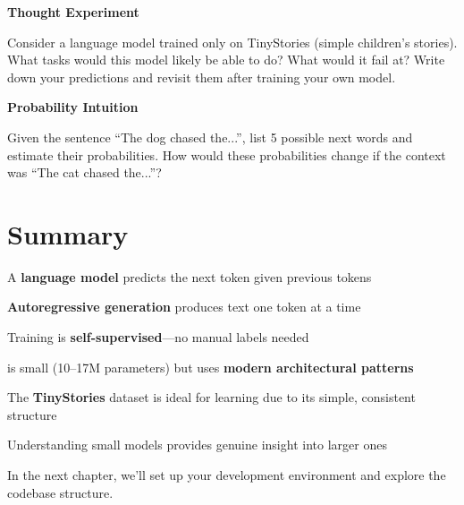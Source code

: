 \begin{exercise}
\textbf{Thought Experiment}

Consider a language model trained only on TinyStories (simple children's stories). What tasks would this model likely be able to do? What would it fail at? Write down your predictions and revisit them after training your own model.
\end{exercise}

\begin{exercise}
\textbf{Probability Intuition}

Given the sentence ``The dog chased the...'', list 5 possible next words and estimate their probabilities. How would these probabilities change if the context was ``The cat chased the...''?
\end{exercise}

\section{Summary}

\begin{summary}
    \item A \textbf{language model} predicts the next token given previous tokens
    \item \textbf{Autoregressive generation} produces text one token at a time
    \item Training is \textbf{self-supervised}---no manual labels needed
    \item \TryLM is small (10--17M parameters) but uses \textbf{modern architectural patterns}
    \item The \textbf{TinyStories} dataset is ideal for learning due to its simple, consistent structure
    \item Understanding small models provides genuine insight into larger ones
\end{summary}

In the next chapter, we'll set up your development environment and explore the \TryLM codebase structure.
